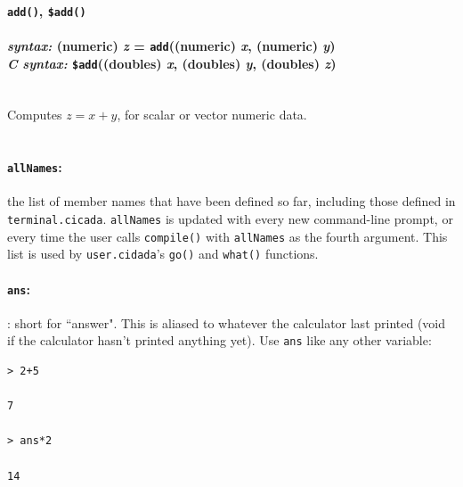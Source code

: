 \documentclass{article}
\newenvironment{code}{
       \begin{list}{}{
               \setlength{\leftmargin}{.4in}
               \setlength{\rightmargin}{0in}
               \setlength{\topsep}{.2in}
       }
       \small
       \item[] }
       { \end{list}   }
\begin{document}




\paragraph{\texttt{add()}, \texttt{\$add()}\\\\
\normalfont \emph{syntax: } (numeric) \emph{z} = \texttt{add}((numeric) \emph{x}, (numeric) \emph{y})\\
\normalfont \emph{C syntax: } \texttt{\$add}((doubles) \emph{x}, (doubles) \emph{y}, (doubles) \emph{z})\\\\}

Computes $z = x + y$, for scalar or vector numeric data.\\\\





\paragraph{\texttt{allNames}:}  the list of member names that have been defined so far, including those defined in \verb#terminal.cicada#.  \verb#allNames# is updated with every new command-line prompt, or every time the user calls \verb#compile()# with \verb#allNames# as the fourth argument.  This list is used by \verb#user.cidada#'s \verb#go()# and \verb#what()# functions.





\paragraph{\texttt{ans}:}:  short for ``answer".  This is aliased to whatever the calculator last printed (void if the calculator hasn't printed anything yet).  Use \verb#ans# like any other variable:

\begin{code} \begin{verbatim}
> 2+5

7

> ans*2

14
\end{verbatim} \end{code}
\end{document}

